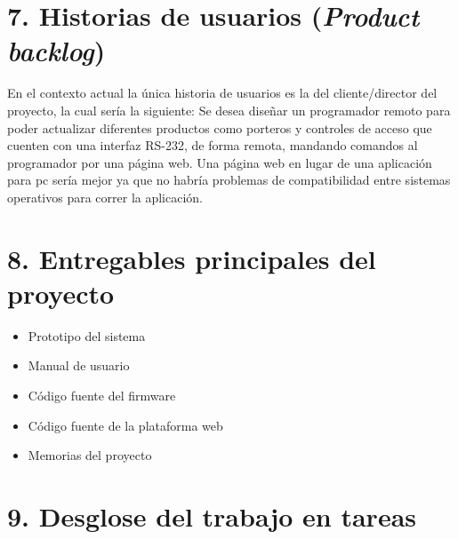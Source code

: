 \documentclass[
11pt, %
]{charter}
\begin{document}
\section{7. Historias de usuarios (\textit{Product backlog})}
\label{sec:backlog}

En el contexto actual la única historia de usuarios es la del cliente/director del proyecto, la cual sería la siguiente:
Se desea diseñar un programador remoto para poder actualizar diferentes productos como porteros y controles de acceso que cuenten con una interfaz RS-232, de forma remota, mandando comandos al programador por una página web. Una página web en lugar de una aplicación para pc sería mejor ya que no habría problemas de compatibilidad entre sistemas operativos para correr la aplicación.

\newpage
\section{8. Entregables principales del proyecto}
\label{sec:entregables}

\begin{itemize}
	\item Prototipo del sistema
	\item Manual de usuario
	\item Código fuente del firmware
	\item Código fuente de la plataforma web
	\item Memorias del proyecto
\end{itemize}


\section{9. Desglose del trabajo en tareas}
\label{sec:wbs}
\end{document}
